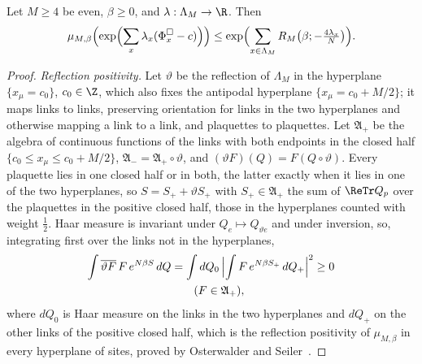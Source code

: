 \begin{lemma}\label{rU7:chess}
Let $M\ge4$ be even, $\beta\ge0$, and $\lambda:\Lambda_M\to\R$. Then
\[
\mu_{M,\beta}\Bigl(\exp\Bigl(\sum_x\lambda_x(\Phi^\square_x-c)\Bigr)\Bigr)
\le\exp\Bigl(\sum_{x\in\Lambda_M}R_M\bigl(\beta;-\tfrac{4\lambda_x}N\bigr)
\Bigr) .
\]
\end{lemma}

\begin{proof}
\emph{Reflection positivity.} Let $\vartheta$ be the reflection of
$\Lambda_M$ in the hyperplane $\{x_\mu=c_0\}$, $c_0\in\Z$, which also fixes
the antipodal hyperplane $\{x_\mu=c_0+M/2\}$; it maps links to links,
preserving orientation for links in the two hyperplanes and otherwise
mapping a link to a link, and plaquettes to plaquettes. Let $\mathfrak A_+$
be the algebra of continuous functions of the links with both endpoints in
the closed half $\{c_0\le x_\mu\le c_0+M/2\}$, $\mathfrak A_-=\mathfrak A_+
\circ\vartheta$, and $(\vartheta F)(Q)=F(Q\circ\vartheta)$. Every plaquette
lies in one closed half or in both, the latter exactly when it lies in one
of the two hyperplanes, so $S=S_++\vartheta S_+$ with $S_+\in\mathfrak A_+$
the sum of $\ReTr Q_p$ over the plaquettes in the positive closed half,
those in the hyperplanes counted with weight $\frac12$. Haar measure is
invariant under $Q_e\mapsto Q_{\vartheta e}$ and under inversion, so,
integrating first over the links not in the hyperplanes,
\begin{align*}
\int\overline{\vartheta F}\,F\,e^{N\beta S}\,dQ&=\int dQ_0\,
\Bigl|\int F\,e^{N\beta S_+}\,dQ_+\Bigr|^2\ge0\\
&\qquad(F\in\mathfrak A_+) ,
\end{align*}
where $dQ_0$ is Haar measure on the links in the two hyperplanes and $dQ_+$
on the other links of the positive closed half,
which is the reflection positivity of $\mu_{M,\beta}$ in every hyperplane of
sites, proved by Osterwalder and Seiler~\cite{OSei78}.


\end{proof}
